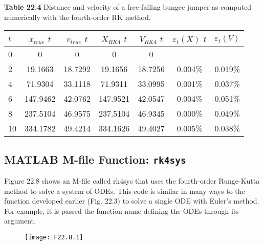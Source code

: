 \documentclass[../main.tex]{subfiles}
\begin{document}
\vspace{0,3in}
\textbf{Table 22.4} Distance and velocity of a free-falling bungee jumper as computed
numerically with the fourth-order RK method.
\\
\begin{tabular}{lcccccc}
\hline

	\textbf{$t$} \; \; \; \; \; & \textbf{$x_{true}$} 
	\textbf{$t$} \; \; \; \; \; & \textbf{$v_{true}$} 
	\textbf{$t$} \; \; \; \; \; & \textbf{$X_{RK4}$} 
	\textbf{$t$} \; \; \; \; \; & \textbf{$V_{RK4}$} 
	\textbf{$t$} \; \; \; \; \; & \textbf{$\varepsilon_{t}(X)$} 
	\textbf{$t$} \; \; \; \; \; & \textbf{$\varepsilon_{t}(V)$}\\
	
\hline

	0 & 0 & 0 & 0 & 0 & \vspace{0in} & \vspace{0in}\\

	2 & 19.1663 & 18.7292 & 19.1656 & 18.7256 & 0.004\% & 0.019\%\\

	4 & 71.9304 & 33.1118 & 71.9311 & 33.0995 & 0.001\% & 0.037\%\\

	6 & 147.9462 & 42.0762 & 147.9521 & 42.0547 & 0.004\% & 0.051\%\\

	8 & 237.5104 & 46.9575 & 237.5104 & 46.9345 & 0.000\% & 0.049\%\\

	10 & 334.1782 & 49.4214 & 334.1626 & 49.4027 & 0.005\% & 0.038\%\\


\hline
\end{tabular}

\subsection{MATLAB M-file Function: \texttt{rk4sys}}

Figure 22.8 shows an M-file called rk4sys that uses the fourth-order Runge-Kutta method
to solve a system of ODEs. This code is similar in many ways to the function developed
earlier (Fig. 22.3) to solve a single ODE with Euler's method. For example, it is passed the
function name defining the ODEs through its argument.
\pagebreak
\begin{figure}[hbt!]
	\texttt{[image: F22.8.1]}
	\label{F22.8.1}
\end{figure}\\
\end{document}
